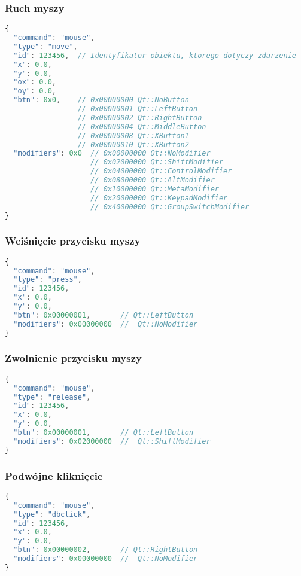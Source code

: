 \subsubsection{Ruch myszy}
\begin{lstlisting}[language=JavaScript,numbers=none]
{
  "command": "mouse",
  "type": "move",
  "id": 123456,  // Identyfikator obiektu, ktorego dotyczy zdarzenie
  "x": 0.0,
  "y": 0.0,
  "ox": 0.0,
  "oy": 0.0,
  "btn": 0x0,    // 0x00000000 Qt::NoButton
                 // 0x00000001 Qt::LeftButton
                 // 0x00000002 Qt::RightButton
                 // 0x00000004 Qt::MiddleButton
                 // 0x00000008 Qt::XButton1
                 // 0x00000010 Qt::XButton2
  "modifiers": 0x0  // 0x00000000 Qt::NoModifier
                    // 0x02000000 Qt::ShiftModifier
                    // 0x04000000 Qt::ControlModifier
                    // 0x08000000 Qt::AltModifier
                    // 0x10000000 Qt::MetaModifier
                    // 0x20000000 Qt::KeypadModifier
                    // 0x40000000 Qt::GroupSwitchModifier
}
\end{lstlisting}

\subsubsection{Wciśnięcie przycisku myszy}
\begin{lstlisting}[language=JavaScript,numbers=none]
{
  "command": "mouse",
  "type": "press",
  "id": 123456,
  "x": 0.0,
  "y": 0.0,
  "btn": 0x00000001,       // Qt::LeftButton
  "modifiers": 0x00000000  //  Qt::NoModifier
}
\end{lstlisting}

\subsubsection{Zwolnienie przycisku myszy}
\begin{lstlisting}[language=JavaScript,numbers=none]
{
  "command": "mouse",
  "type": "release",
  "id": 123456,
  "x": 0.0,
  "y": 0.0,
  "btn": 0x00000001,       // Qt::LeftButton
  "modifiers": 0x02000000  //  Qt::ShiftModifier
}
\end{lstlisting}

\subsubsection{Podwójne kliknięcie}
\begin{lstlisting}[language=JavaScript,numbers=none]
{
  "command": "mouse",
  "type": "dbclick",
  "id": 123456,
  "x": 0.0,
  "y": 0.0,
  "btn": 0x00000002,       // Qt::RightButton
  "modifiers": 0x00000000  //  Qt::NoModifier
}
\end{lstlisting}

